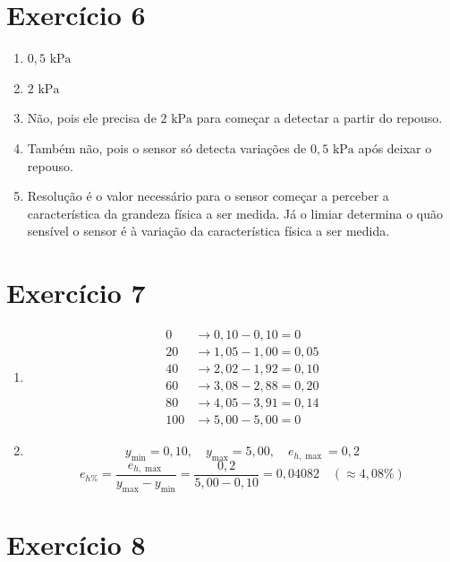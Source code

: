 \section*{Exercício 6}

\begin{enumerate}
    \item[\textbf{a)}] $0{,}5\text{ kPa}$
    \item[\textbf{b)}] $2\text{ kPa}$
    \item[\textbf{c)}] Não, pois ele precisa de $2\text{ kPa}$ para começar a detectar a partir do repouso.
    \item[\textbf{d)}] Também não, pois o sensor só detecta variações de $0{,}5\text{ kPa}$ após deixar o repouso.
    \item[\textbf{e)}] Resolução é o valor necessário para o sensor começar a perceber a característica da grandeza física a ser medida. Já o limiar determina o quão sensível o sensor é à variação da característica física a ser medida.
\end{enumerate}

\section*{Exercício 7}

\begin{enumerate}
    \item[\textbf{a)}] 
    \begin{align*}
    0 &\to 0{,}10 - 0{,}10 = 0 \\
    20 &\to 1{,}05 - 1{,}00 = 0{,}05 \\
    40 &\to 2{,}02 - 1{,}92 = 0{,}10 \\
    60 &\to 3{,}08 - 2{,}88 = 0{,}20 \\
    80 &\to 4{,}05 - 3{,}91 = 0{,}14 \\
    100 &\to 5{,}00 - 5{,}00 = 0
    \end{align*}

    \item[\textbf{b)}] 
    \[
    y_{\min} = 0{,}10, \quad y_{\max} = 5{,}00, \quad e_{h,\max} = 0{,}2
    \]
    \[
    e_{h\%} = \frac{e_{h,\max}}{y_{\max} - y_{\min}} = \frac{0{,}2}{5{,}00 - 0{,}10} = 0{,}04082 \quad (\approx 4{,}08\%)
    \]
\end{enumerate}

\section*{Exercício 8}

